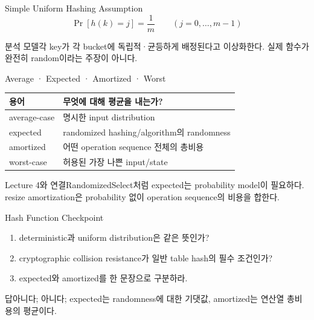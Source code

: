 \begin{frame}{Simple Uniform Hashing Assumption}
\[
\Pr[h(k)=j]=\frac1m\qquad (j=0,\ldots,m-1)
\]
\begin{block}{분석 모델}각 key가 각 bucket에 독립적·균등하게 배정된다고 이상화한다. 실제 함수가 완전히 random이라는 주장이 아니다.\end{block}
\end{frame}
\begin{frame}{Average · Expected · Amortized · Worst}
\small\centering\begin{tabular}{ll}\toprule
용어&무엇에 대해 평균을 내는가?\\\midrule
average-case&명시한 input distribution\\
expected&randomized hashing/algorithm의 randomness\\
amortized&어떤 operation sequence 전체의 총비용\\
worst-case&허용된 가장 나쁜 input/state\\\bottomrule
\end{tabular}
\begin{alertblock}{Lecture 4와 연결}RandomizedSelect처럼 expected는 probability model이 필요하다. resize amortization은 probability 없이 operation sequence의 비용을 합한다.\end{alertblock}
\end{frame}
\begin{frame}{Hash Function Checkpoint}
\begin{enumerate}\item deterministic과 uniform distribution은 같은 뜻인가?\item cryptographic collision resistance가 일반 table hash의 필수 조건인가?\item expected와 amortized를 한 문장으로 구분하라.\end{enumerate}
\begin{exampleblock}{답}아니다; 아니다; expected는 randomness에 대한 기댓값, amortized는 연산열 총비용의 평균이다.\end{exampleblock}
\end{frame}
